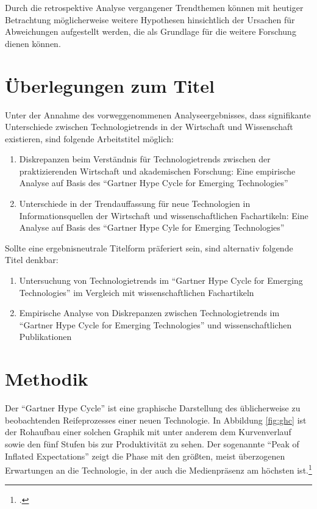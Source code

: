 Durch die retrospektive Analyse vergangener Trendthemen können mit heutiger Betrachtung möglicherweise weitere Hypothesen hinsichtlich der Ursachen für Abweichungen aufgestellt werden, die als Grundlage für die weitere Forschung dienen können.

\section{Überlegungen zum Titel}
Unter der Annahme des vorweggenommenen Analyseergebnisses, dass signifikante Unterschiede zwischen Technologietrends in der Wirtschaft und Wissenschaft existieren, sind folgende Arbeitstitel möglich:
\begin{enumerate}
	\item Diskrepanzen beim Verständnis für Technologietrends zwischen der praktizierenden Wirtschaft und akademischen Forschung: Eine empirische Analyse auf Basis des "`Gartner Hype Cycle for Emerging Technologies"'
	\item Unterschiede in der Trendauffassung für neue Technologien in Informationsquellen der Wirtschaft und wissenschaftlichen Fachartikeln: Eine Analyse auf Basis des "`Gartner Hype Cyle for Emerging Technologies"'
\end{enumerate}

Sollte eine ergebnisneutrale Titelform präferiert sein, sind alternativ folgende Titel denkbar:
\begin{enumerate}
	\item Untersuchung von Technologietrends im "`Gartner Hype Cycle for Emerging Technologies"' im Vergleich mit wissenschaftlichen Fachartikeln
	\item Empirische Analyse von Diskrepanzen zwischen Technologietrends im "`Gartner Hype Cycle for Emerging Technologies"' und wissenschaftlichen Publikationen
\end{enumerate}


\section{Methodik}
Der "`Gartner Hype Cycle"' ist eine graphische Darstellung des üblicherweise zu beobachtenden Reifeprozesses einer neuen Technologie. In Abbildung \ref{fig:ghc} ist der Rohaufbau einer solchen Graphik mit unter anderem dem Kurvenverlauf sowie den fünf Stufen bis zur Produktivität zu sehen. Der sogenannte "`Peak of Inflated Expectations"' zeigt die Phase mit den größten, meist überzogenen Erwartungen an die Technologie, in der auch die Medienpräsenz am höchsten ist.\footcite[Vgl.][S.~3f]{Fenn2017}


